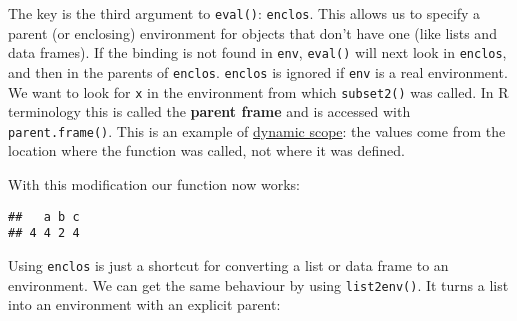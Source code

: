 The key is the third argument to \texttt{eval()}: \texttt{enclos}. This
allows us to specify a parent (or enclosing) environment for objects
that don't have one (like lists and data frames). If the binding is not
found in \texttt{env}, \texttt{eval()} will next look in
\texttt{enclos}, and then in the parents of \texttt{enclos}.
\texttt{enclos} is ignored if \texttt{env} is a real environment. We
want to look for \texttt{x} in the environment from which
\texttt{subset2()} was called. In R terminology this is called the
\textbf{parent frame} and is accessed with \texttt{parent.frame()}. This
is an example of
\href{http://en.wikipedia.org/wiki/Scope_\%28programming\%29\#Dynamic_scoping}{dynamic
scope}: the values come from the location where the function was called,
not where it was defined. 

With this modification our function now works:

\begin{Shaded}
\begin{Highlighting}[]
\StringTok{ }
\StringTok{ }
\StringTok{ }\NormalTok{())}
\NormalTok{\}}

\StringTok{ }
\OperatorTok{==}\StringTok{ }
\end{Highlighting}
\end{Shaded}

\begin{verbatim}
##   a b c
## 4 4 2 4
\end{verbatim}

Using \texttt{enclos} is just a shortcut for converting a list or data
frame to an environment. We can get the same behaviour by using
\texttt{list2env()}. It turns a list into an environment with an
explicit parent: 

\begin{Shaded}
\begin{Highlighting}[]
\StringTok{ }
\StringTok{ }
\StringTok{ } \NormalTok{())}
\StringTok{ }
\NormalTok{\}}

\StringTok{ }
\OperatorTok{==}\StringTok{ }
\end{Highlighting}
\end{Shaded}

